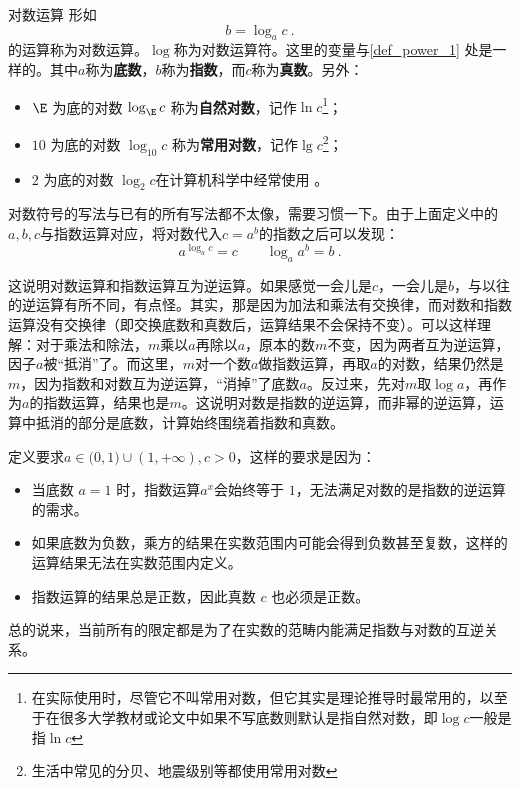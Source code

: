 \begin{definition}{对数运算}
形如
\begin{equation}
b=\log_ac~.
\end{equation}
的运算称为对数运算。$\log$称为对数运算符。这里的变量与\autoref{def_power_1} 处是一样的。其中$a$称为\textbf{底数}，$b$称为\textbf{指数}，而$c$称为\textbf{真数}。另外：
\begin{itemize}
\item $\E$ 为底的对数 $\log_{\E} c$ 称为\textbf{自然对数}，记作$\ln c$\footnote{在实际使用时，尽管它不叫常用对数，但它其实是理论推导时最常用的，以至于在很多大学教材或论文中如果不写底数则默认是指自然对数，即$\log c$一般是指$\ln c$}；
\item $10$ 为底的对数 $\log_{10} c$ 称为\textbf{常用对数}，记作$\lg c$\footnote{生活中常见的分贝、地震级别等都使用常用对数}；
\item $2$ 为底的对数 $\log_{2} c$在计算机科学中经常使用 。
\end{itemize}
\end{definition}

对数符号的写法与已有的所有写法都不太像，需要习惯一下。由于上面定义中的$a,b,c$与指数运算对应，将对数代入$c=a^b$的指数之后可以发现：
\begin{equation}
a^{\log_a c}=c\qquad \log_a a^b=b~.
\end{equation}

这说明对数运算和指数运算互为逆运算。如果感觉一会儿是$c$，一会儿是$b$，与以往的逆运算有所不同，有点怪。其实，那是因为加法和乘法有交换律，而对数和指数运算没有交换律（即交换底数和真数后，运算结果不会保持不变）。可以这样理解：对于乘法和除法，$m$乘以$a$再除以$a$，原本的数$m$不变，因为两者互为逆运算，因子$a$被“抵消”了。而这里，$m$对一个数$a$做指数运算，再取$a$的对数，结果仍然是$m$，因为指数和对数互为逆运算，“消掉”了底数$a$。反过来，先对$m$取$\log a$，再作为$a$的指数运算，结果也是$m$。这说明对数是指数的逆运算，而非幂的逆运算，运算中抵消的部分是底数，计算始终围绕着指数和真数。

定义要求$a\in\mathbb (0,1)\cup(1,+\infty),c>0$，这样的要求是因为：
\begin{itemize}
\item 当底数  $a = 1$  时，指数运算$a^x$会始终等于 $1$，无法满足对数的是指数的逆运算的需求。
\item 如果底数为负数，乘方的结果在实数范围内可能会得到负数甚至复数，这样的运算结果无法在实数范围内定义。
\item 指数运算的结果总是正数，因此真数  $c$  也必须是正数。
\end{itemize}
总的说来，当前所有的限定都是为了在实数的范畴内能满足指数与对数的互逆关系。

